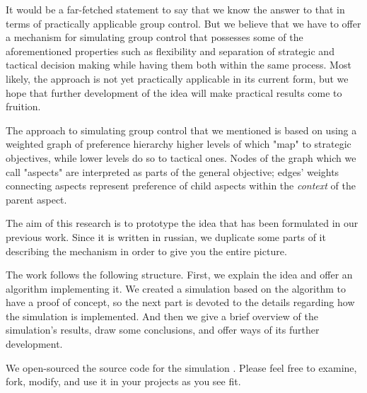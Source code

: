It would be a far-fetched statement to say that we know the answer to that in terms of practically applicable group
control. But we believe that we have to offer a mechanism for simulating group control that possesses some of the
aforementioned properties such as flexibility and separation of strategic and tactical decision making while having them
both within the same process. Most likely, the approach is not yet practically applicable in its current form, but we
hope that further development of the idea will make practical results come to fruition.

The approach to simulating group control that we mentioned is based on using a weighted graph of preference hierarchy
higher levels of which "map" to strategic objectives, while lower levels do so to tactical ones. Nodes of the graph
which we call "aspects" are interpreted as parts of the general objective; edges' weights connecting aspects represent
preference of child aspects within the \textit{context} of the parent aspect.


The aim of this research is to prototype the idea that has been formulated in our previous work. Since it is written in
russian, we duplicate some parts of it describing the mechanism in order to give you the entire picture.

The work follows the following structure. First, we explain the idea and offer an algorithm implementing it. We created
a simulation based on the algorithm to have a proof of concept, so the next part is devoted to the details regarding how
the simulation is implemented. And then we give a brief overview of the simulation's results, draw some conclusions, and
offer ways of its further development.

We open-sourced the source code for the simulation \cite{github}. Please feel free to examine, fork, modify, and use it
in your projects as you see fit.
